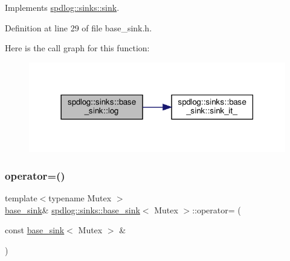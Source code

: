 Implements \hyperlink{classspdlog_1_1sinks_1_1sink_a51d8f34ad79064e0dc13c6013236e427}{spdlog\+::sinks\+::sink}.



Definition at line 29 of file base\+\_\+sink.\+h.

Here is the call graph for this function\+:
\nopagebreak
\begin{figure}[H]
\begin{center}
\leavevmode
\includegraphics[width=318pt]{classspdlog_1_1sinks_1_1base__sink_a6a72602ffe60fdfe6a3cbfbecca54bb0_cgraph}
\end{center}
\end{figure}
\mbox{\label{classspdlog_1_1sinks_1_1base__sink_a1b99823aeb2513a891bba168639421a9}} 
\subsubsection{\texorpdfstring{operator=()}{operator=()}}
{\footnotesize\ttfamily template$<$typename Mutex $>$ \\
\hyperlink{classspdlog_1_1sinks_1_1base__sink}{base\+\_\+sink}\& \hyperlink{classspdlog_1_1sinks_1_1base__sink}{spdlog\+::sinks\+::base\+\_\+sink}$<$ Mutex $>$\+::operator= (\begin{DoxyParamCaption}\item[{const \hyperlink{classspdlog_1_1sinks_1_1base__sink}{base\+\_\+sink}$<$ Mutex $>$ \&}]{ }\end{DoxyParamCaption})\hspace{0.3cm}{\ttfamily [delete]}}

\mbox{\label{classspdlog_1_1sinks_1_1base__sink_ad66435c2e9e0adb06ee279dde88a2243}} 
